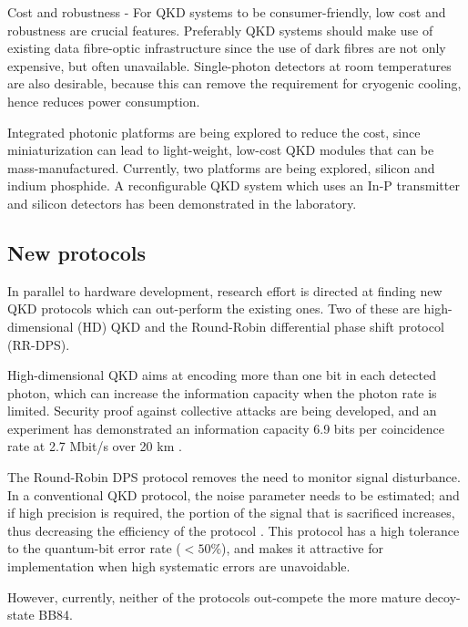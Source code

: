 Cost and robustness - 
For QKD systems to be consumer-friendly, low cost and robustness are crucial features. Preferably QKD systems should make use of existing data fibre-optic infrastructure since the use of dark fibres are not only expensive, but often unavailable\cite{diamanti2016practical}. Single-photon detectors at room temperatures are also desirable, 
because this can remove the requirement for cryogenic cooling, hence reduces power consumption.

Integrated photonic platforms are being explored to reduce the cost, since miniaturization can lead to light-weight, low-cost QKD modules that can be mass-manufactured. 
Currently, two platforms are being explored, silicon\cite{lim2014review} and indium phosphide\cite{smit2014introduction}.
A reconfigurable QKD system which uses an In-P transmitter and silicon detectors has been demonstrated in the laboratory\cite{sibson2017chip}.




\subsection{New protocols}
In parallel to hardware development, research effort is directed at finding new QKD protocols which can out-perform the existing ones. Two of these are high-dimensional (HD) QKD and the Round-Robin differential phase shift protocol (RR-DPS).

High-dimensional QKD aims at encoding more than one bit in each detected photon, which can increase the information capacity when the photon rate is limited.
Security proof against collective attacks are being developed, and an experiment has demonstrated an information capacity
 6.9 bits per coincidence rate at 2.7 Mbit/s over 20 km \cite{zhong2015photon}.

The Round-Robin DPS protocol\cite{sasaki2014practical} removes the need to monitor signal disturbance. In a conventional QKD protocol, the noise parameter needs to
be estimated; and if high precision is required, the portion of the signal that is sacrificed increases, thus decreasing the efficiency of the protocol \cite{cai2009finite,hayashi2014security}. This protocol has a high tolerance to
the quantum-bit error rate ($< 50\%$)\cite{xu2015discrete}, and makes it attractive for implementation when high systematic errors are unavoidable.   

However, currently, neither of the protocols out-compete the more mature decoy-state BB84.

